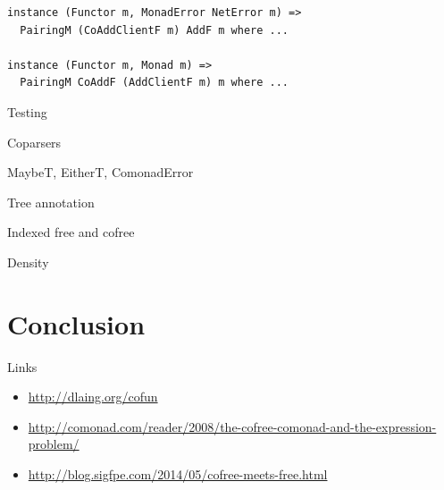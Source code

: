 \documentclass{beamer}
\begin{document}
\begin{frame}[fragile]
  \begin{verbatim}
instance (Functor m, MonadError NetError m) =>
  PairingM (CoAddClientF m) AddF m where ...

instance (Functor m, Monad m) =>
  PairingM CoAddF (AddClientF m) m where ...
  \end{verbatim}
\end{frame}

\begin{frame}[c]
  \centering
  Testing
\end{frame}

\begin{frame}[c]
  \centering
  Coparsers
\end{frame}

\begin{frame}[c]
  \centering
  MaybeT, EitherT, ComonadError
\end{frame}

\begin{frame}[c]
  \centering
  Tree annotation
\end{frame}

\begin{frame}[c]
  \centering
  Indexed free and cofree
\end{frame}

\begin{frame}[c]
  \centering
  Density
\end{frame}

\section{Conclusion}

\begin{frame}[c]
  \centering
  Links
  \begin{itemize}
  \item<1-> \href{http://dlaing.org/cofun}{http://dlaing.org/cofun}
  \item<2-> \href{http://comonad.com/reader/2008/the-cofree-comonad-and-the-expression-problem/}{http://comonad.com/reader/2008/the-cofree-comonad-and-the-expression-problem/}
  \item<3-> \href{http://blog.sigfpe.com/2014/05/cofree-meets-free.html}{http://blog.sigfpe.com/2014/05/cofree-meets-free.html}
  \end{itemize}
\end{frame}
\end{document}

